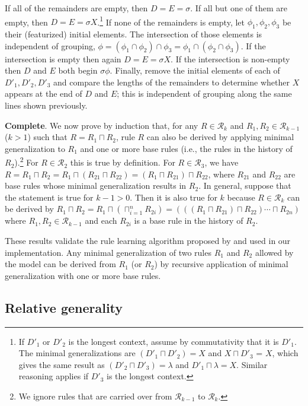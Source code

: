 \documentclass[11pt]{article}
\begin{document}
If all of the remainders are empty, then $D = E = \sigma$. If all but one of them are empty, then $D = E = \sigma X$.\footnote{If $D'_1$ or $D'_2$ is the longest context, assume by commutativity that it is $D'_1$. The minimal generalizations are $(D'_1 \sqcap D'_2) = X$ and $X \sqcap D'_3$ = $X$, which gives the same result as $(D'_2 \sqcap D'_3) = \lambda$ and $D'_1 \sqcap \lambda = X$. Similar reasoning applies if $D'_3$ is the longest context.} If none of the remainders is empty, let $\phi_1, \phi_2, \phi_3$ be their (featurized) initial elements. The intersection of those elements is independent of grouping, $\phi = (\phi_1 \cap \phi_2) \cap \phi_3 = \phi_1 \cap (\phi_2 \cap \phi_3)$. If the intersection is empty then again $D = E = \sigma X$. If the intersection is non-empty then $D$ and $E$ both begin $\sigma\phi$. Finally, remove the initial elements of each of $D'_1, D'_2, D'_3$ and compare the lengths of the remainders to determine whether $X$ appears at the end of $D$ and $E$; this is independent of grouping along the same lines shown previously.

\textbf{Complete}. \qquad We now prove by induction that, for any $R \in \mathcal{R}_k$ and $R_1, R_2 \in \mathcal{R}_{k-1}$ ($k > 1$) such that $R = R_1 \sqcap R_2$, rule $R$ can also be derived by applying minimal generalization to $R_1$ and one or more base rules (i.e., the rules in the history of $R_2$).\footnote{We ignore rules that are carried over from $\mathcal{R}_{k-1}$ to $\mathcal{R}_{k}$.} For $R \in \mathcal{R}_2$ this is true by definition. For $R \in \mathcal{R}_3$, we have $R = R_1 \sqcap R_2 = R_1 \sqcap (R_{21} \sqcap R_{22}) = (R_1 \sqcap R_{21}) \sqcap R_{22}$, where $R_{21}$ and $R_{22}$ are base rules whose minimal generalization results in $R_2$. In general, suppose that the statement is true for $k-1 > 0$. Then it is also true for $k$ because $R \in \mathcal{R}_k$ can be derived by $R_1 \sqcap R_2 = R_1 \sqcap (\sqcap_{i=1}^{n} R_{2i}) = (((R_{1} \sqcap R_{21}) \sqcap R_{22}) \cdots \sqcap R_{2n})$ where $R_1, R_2 \in \mathcal{R}_{k-1}$ and each $R_{2i}$ is a base rule in the history of $R_2$.

These results validate the rule learning algorithm proposed by \citet{albright-hayes-2002-modeling} and used in our implementation. Any minimal generalization of two rules $R_1$ and $R_2$ allowed by the model can be derived from $R_1$ (or $R_2$) by recursive application of minimal generalization with one or more base rules.


\subsection{Relative generality}
\label{subsec:generality}
\end{document}
